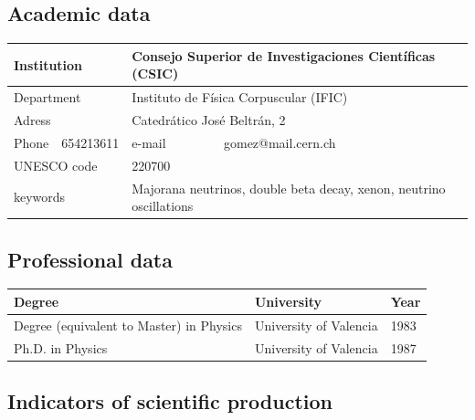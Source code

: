 \documentclass[a4paper,11pt,oneside]{article}
\begin{document}
\subsection{Academic data}
\begin{table}[h!]
\begin{center}
\begin{tabular}{| l | l | l | l |}
\hline
\multicolumn{2}{|l|}{Institution} & \multicolumn{2}{|l|}{ Consejo Superior de Investigaciones Científicas  (CSIC)}\\
\hline
\multicolumn{2}{|l|}{Department} & \multicolumn{2}{|l|}{ Instituto de Física Corpuscular (IFIC) }\\
\hline
\multicolumn{2}{|l|}{Adress} & \multicolumn{2}{|l|}{ Catedrático José Beltrán, 2  }\\
\hline
Phone & 654213611 & e-mail & gomez@mail.cern.ch\\
\hline
\multicolumn{2}{|l|}{UNESCO code} & \multicolumn{2}{|l|}{ 220700  }\\
\hline
\multicolumn{2}{|l|}{keywords} & \multicolumn{2}{|l|}{ Majorana neutrinos, double beta decay, xenon, neutrino oscillations}\\
\hline
\end{tabular}
\label{tab:profesional}
\end{center}
\end{table} 

\subsection{Professional data}
\begin{table}[h!]
\begin{center}
\begin{tabular}{| l | l | l | }
\hline
Degree & University & Year\\
\hline
Degree (equivalent to Master) in Physics & University of Valencia & 1983 \\
Ph.D. in Physics & University of Valencia & 1987 \\
\hline
\end{tabular}
\label{tab:academic}
\end{center}
\end{table} 

\subsection{Indicators of scientific production}
\end{document}

